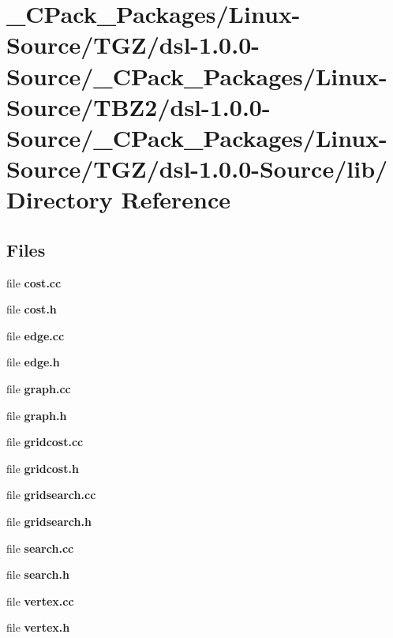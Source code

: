 \section{\_\-CPack\_\-Packages/Linux-\/Source/TGZ/dsl-\/1.0.0-\/Source/\_\-CPack\_\-Packages/Linux-\/Source/TBZ2/dsl-\/1.0.0-\/Source/\_\-CPack\_\-Packages/Linux-\/Source/TGZ/dsl-\/1.0.0-\/Source/lib/ Directory Reference}
\label{dir_a6f458bb665550ea289e1d9f3da77618}
\subsection*{Files}
\begin{DoxyCompactItemize}
\item 
file {\bf cost.cc}
\item 
file {\bf cost.h}
\item 
file {\bf edge.cc}
\item 
file {\bf edge.h}
\item 
file {\bf graph.cc}
\item 
file {\bf graph.h}
\item 
file {\bf gridcost.cc}
\item 
file {\bf gridcost.h}
\item 
file {\bf gridsearch.cc}
\item 
file {\bf gridsearch.h}
\item 
file {\bf search.cc}
\item 
file {\bf search.h}
\item 
file {\bf vertex.cc}
\item 
file {\bf vertex.h}
\end{DoxyCompactItemize}
